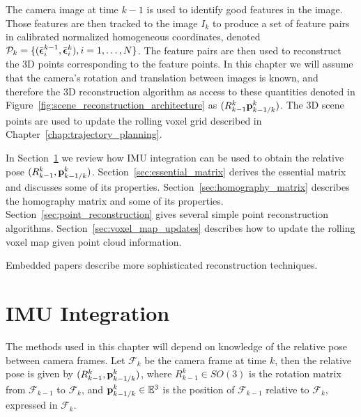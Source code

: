 %
The camera image at time $k-1$ is used to identify good features in the image.  Those features are then tracked to the image $I_k$ to produce a set of feature pairs in calibrated normalized homogeneous coordinates, denoted $\mathcal{P}_k = \{(\bar{\boldsymbol{\epsilon}}_i^{k-1},\bar{\boldsymbol{\epsilon}}_i^{k}), i=1,\dots, N\}$.  The feature pairs are then used to reconstruct the 3D points corresponding to the feature points.  In this chapter we will assume that the camera's rotation and translation between images is known, and therefore the 3D reconstruction algorithm as access to these quantities denoted in Figure~\ref{fig:scene_reconstruction_architecture} as $(R_{k-1}^k \mathbf{p}_{k-1/k}^k)$.  The 3D scene points are used to update the rolling voxel grid described in Chapter~\ref{chap:trajectory_planning}.
	
In Section~\ref{sec:imu_integration} we review how IMU integration can be used to obtain the relative pose $(R_{k-1}^k, \mathbf{p}_{k-1/k}^k)$.  
%	
Section~\ref{sec:essential_matrix} derives  the essential matrix and discusses some of its properties. 
%
Section~\ref{sec:homography_matrix} describes the homography matrix and some of its properties.  
%
Section~\ref{sec:point_reconstruction} gives several simple point reconstruction algorithms.
%
Section~\ref{sec:voxel_map_updates} describes how to update the rolling voxel map given point cloud information.

Embedded papers describe more sophisticated reconstruction techniques.



\section{IMU Integration}
\label{sec:imu_integration}
The methods used in this chapter will depend on knowledge of the relative pose between camera frames.  Let $\mathcal{F}_{k}$ be the camera frame at time $k$, then the relative pose is given by $(R_{k-1}^k, \mathbf{p}_{k-1/k}^k)$, where $R_{k-1}^k\in SO(3)$ is the rotation matrix from $\mathcal{F}_{k-1}$ to $\mathcal{F}_k$, and $\mathbf{p}_{k-1/k}^k\in\mathbb{E}^3$ is the position of $\mathcal{F}_{k-1}$ relative to $\mathcal{F}_k$, expressed in $\mathcal{F}_k$. 

